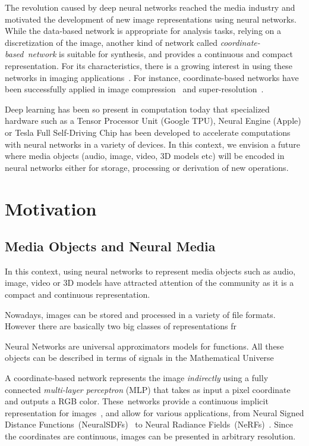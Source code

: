 The revolution caused by deep neural networks reached the media industry and motivated the development of new image representations using neural networks. While the data-based network is appropriate for analysis tasks, relying on a discretization of the image, another kind of network called \textit{coordinate-based~network} is suitable for synthesis, and provides a continuous and compact representation. For its characteristics, there is a growing interest in using these networks in imaging applications~\cite{xie2022neural}. For instance, coordinate-based networks have been successfully applied in image compression~\cite{dupont2021coin} and super-resolution~\cite{czerkawski2021neural}.

Deep learning has been so present in computation today that specialized hardware such as a Tensor Processor Unit (Google TPU), Neural Engine (Apple) or Tesla Full Self-Driving Chip has been developed to accelerate computations with neural networks in a variety of devices. In this context, we envision a future where media objects (audio, image, video, 3D models etc) will be encoded in neural networks either for storage, processing or derivation of new operations.

\section{Motivation}

\subsection{Media Objects and Neural Media}

In this context, using neural networks to represent media objects such as audio, image, video or 3D models have attracted attention of the community as it is a compact and continuous representation. 

Nowadays, images can be stored and processed in a variety of file formats. However there are basically two big classes of representations fr

Neural Networks are universal approximators models for functions. All these objects can be described in terms of signals in the Mathematical Universe



A coordinate-based network represents the image \emph{indirectly} using a fully connected \textit{multi-layer perceptron} (MLP) that takes as input a pixel coordinate and outputs a RGB color. These~networks provide a continuous implicit representation for images~\cite{chen2021learning}, and allow for various applications, from Neural Signed Distance Functions~(NeuralSDFs)~\cite{park2019deepsdf} to Neural Radiance Fields~(NeRFs)~\cite{2020nerf}. Since the coordinates are continuous, images can be presented in arbitrary resolution.


